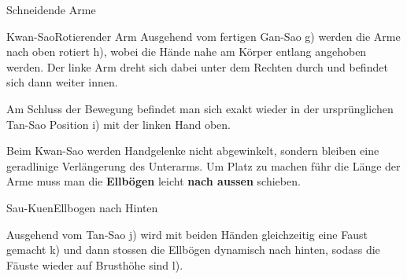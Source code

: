 \begin{WTSatz}{Schneidende Arme}
\begin{WTSatzTeil}{Kwan-Sao}{Rotierender Arm}
		Ausgehend vom fertigen Gan-Sao g) werden die Arme nach oben rotiert h), wobei die H\"ande nahe am K\"orper entlang angehoben werden. Der linke Arm dreht sich dabei unter dem Rechten durch und befindet sich dann weiter innen.
		
		Am Schluss der Bewegung befindet man sich exakt wieder in der urspr\"unglichen Tan-Sao Position i) mit der linken Hand oben.
		
		\begin{WTCommonNoob}
			Beim Kwan-Sao werden Handgelenke nicht abgewinkelt, sondern bleiben eine geradlinige Verl\"angerung des Unterarms. Um Platz zu machen f\"uhr die L\"ange der Arme muss man die \textbf{Ellb\"ogen} leicht \textbf{nach aussen} schieben.
		\end{WTCommonNoob}
	\end{WTSatzTeil}
	
	\begin{WTSatzTeil}{Sau-Kuen}{Ellbogen nach Hinten}
		
		Ausgehend vom Tan-Sao j) wird mit beiden H\"anden gleichzeitig eine Faust gemacht k) und dann stossen die Ellb\"ogen dynamisch nach hinten, sodass die F\"auste wieder auf Brusth\"ohe sind l). %
	\end{WTSatzTeil}
	
\end{WTSatz}


